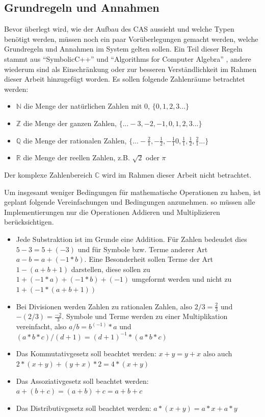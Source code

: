 \documentclass[11pt,a4paper, ngerman]{article}
\begin{document}
\subsection{Grundregeln und Annahmen}
Bevor überlegt wird, wie der Aufbau des CAS aussieht und welche Typen benötigt werden, müssen noch ein paar Vorüberlegungen gemacht werden, welche Grundregeln und Annahmen im System gelten sollen. Ein Teil dieser Regeln stammt aus ``SymbolicC++'' \cite[S. 2]{Tan2000} und ``Algorithms for Computer Algebra'' \cite[S. 23 ff.]{Geddes2007}, andere wiederum sind als Einschränkung oder zur besseren Verständlichkeit im Rahmen dieser Arbeit hinzugefügt worden. Es sollen folgende Zahlenräume betrachtet werden:
\begin{itemize}
    \item $\mathbb{N}$ die Menge der natürlichen Zahlen mit 0, $\{0, 1, 2, 3...\}$
    \item $\mathbb{Z}$ die Menge der ganzen Zahlen, $\{...-3, -2, -1, 0, 1, 2, 3...\}$
    \item $\mathbb{Q}$ die Menge der rationalen Zahlen, $\{...-\frac{2}{1}, -\frac{1}{2}, -\frac{1}{1} 0, \frac{1}{1}, \frac{1}{2}, \frac{2}{1}...\}$
    \item $\mathbb{R}$ die Menge der reellen Zahlen, z.B. $\sqrt{2}$ oder $\pi$
\end{itemize}

Der komplexe Zahlenbereich  $\mathbb{C}$ wird im Rahmen dieser Arbeit nicht betrachtet.

Um insgesamt weniger Bedingungen für mathematische Operationen zu haben, ist geplant folgende Vereinfachungen und Bedingungen anzunehmen. so müssen alle Implementierungen nur die Operationen Addieren und Multiplizieren berücksichtigen.
\begin{itemize}
    \item Jede Substraktion ist im Grunde eine Addition. Für Zahlen bedeudet dies $5-3 = 5+(-3)$ und für Symbole bzw. Terme anderer Art $a-b = a+(-1 * b)$. Eine Besonderheit sollen Terme der Art $1-(a+b+1)$ darstellen, diese sollen zu $1+(-1*a)+(-1*b)+(-1)$ umgeformt werden und nicht zu $1+(-1*(a+b+1))$
    \item Bei Divisionen werden Zahlen zu rationalen Zahlen, also $2/3 = \frac{2}{3}$ und $-(2/3) = \frac{-2}{3}$. Symbole und Terme werden zu einer Multiplikation vereinfacht, also $a/b = b^{(-1)} * a$ und $(a*b*c)/(d+1) = (d+1)^{-1} * (a*b*c)$
    \item Das Kommutativgesetz soll beachtet werden: $x+y = y+x$ also auch $2*(x+y) + (y+x)*2 = 4*(x+y)$
    \item Das Assoziativgesetz soll beachtet werden: $a+(b+c) = (a+b)+c = a+b+c$
    \item Das Distributivgesetz soll beachtet werden: $a*(x+y) = a*x + a*y$
\end{itemize}
\end{document}
